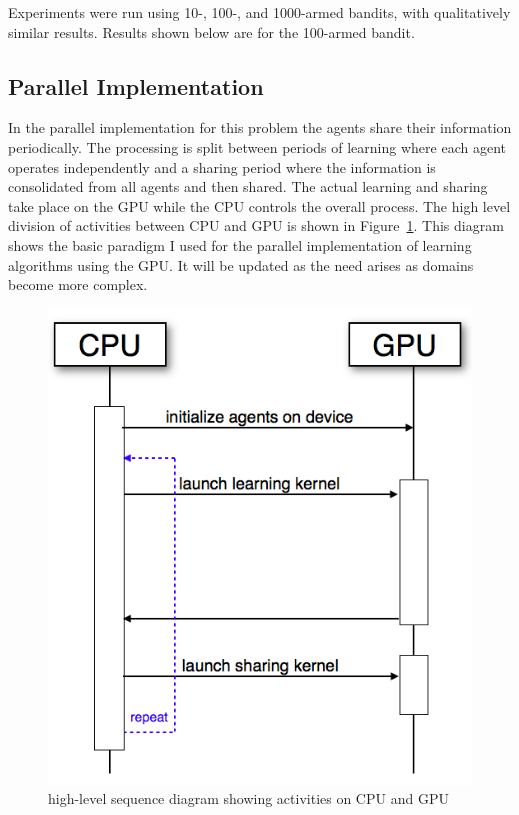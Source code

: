 \documentclass[11pt]{article} %
\begin{document}
Experiments were run using 10-, 100-, and 1000-armed bandits, with qualitatively similar results.  Results shown below are for the 100-armed bandit.

\subsection{Parallel Implementation}
In the parallel implementation for this problem the agents share their information periodically.  The processing is split between periods of learning where each agent operates independently and a sharing period where the information is consolidated from all agents and then shared.  The actual learning and sharing take place on the GPU while the CPU controls the overall process.  The high level division of activities between CPU and GPU is shown in Figure~\ref{fig:seq_diag}.  This diagram shows the basic paradigm I used for the parallel implementation of learning algorithms using the GPU.  It will be updated as the need arises as domains become more complex.

\begin{figure}[hbtp]
\center
\includegraphics[scale=0.3]{fig01a}
\caption{high-level sequence diagram showing activities on CPU and GPU}
\label{fig:seq_diag}
\end{figure}
\end{document}
